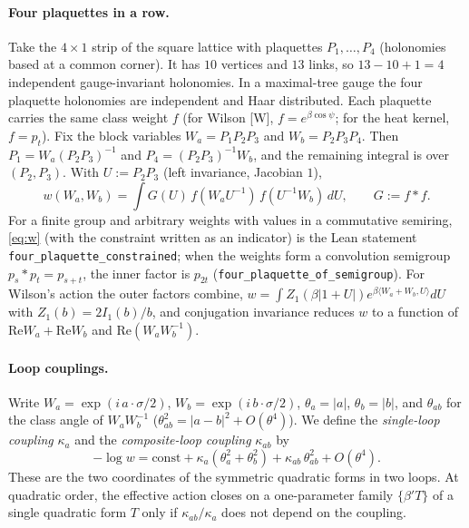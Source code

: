 \documentclass[11pt,a4paper]{article}
\theoremstyle{definition}
\theoremstyle{remark}
\newcommand{\code}[1]{\texttt{#1}}
\begin{document}
\paragraph{Four plaquettes in a row.}
Take the $4\times1$ strip of the square lattice with plaquettes $P_1,\dots,P_4$ (holonomies based at a common corner).
It has $10$ vertices and $13$ links, so $13-10+1=4$ independent gauge-invariant holonomies.
In a maximal-tree gauge the four plaquette holonomies are independent and Haar distributed.
Each plaquette carries the same class weight $f$ (for Wilson [W], $f=e^{\beta\cos\psi}$; for the heat kernel, $f=p_t$).
Fix the block variables $W_a=P_1P_2P_3$ and $W_b=P_2P_3P_4$.
Then $P_1=W_a(P_2P_3)^{-1}$ and $P_4=(P_2P_3)^{-1}W_b$, and the remaining integral is over $(P_2,P_3)$.
With $U:=P_2P_3$ (left invariance, Jacobian $1$),
\begin{equation}\label{eq:w}
w(W_a,W_b)=\int G(U)\,f(W_aU^{-1})\,f(U^{-1}W_b)\,dU,\qquad G:=f*f .
\end{equation}
For a finite group and arbitrary weights with values in a commutative semiring, \eqref{eq:w} (with the constraint written as an indicator) is the Lean statement \code{four\_plaquette\_constrained}; when the weights form a convolution semigroup $p_s*p_t=p_{s+t}$, the inner factor is $p_{2t}$ (\code{four\_plaquette\_of\_semigroup}).
For Wilson's action the outer factors combine, $w=\int Z_1(\beta|1+U|)e^{\beta\langle W_a+W_b,U\rangle}dU$ with $Z_1(b)=2I_1(b)/b$, and conjugation invariance reduces $w$ to a function of $\mathrm{Re}W_a+\mathrm{Re}W_b$ and $\mathrm{Re}(W_aW_b^{-1})$.

\paragraph{Loop couplings.}
Write $W_a=\exp(i\,a\cdot\sigma/2)$, $W_b=\exp(i\,b\cdot\sigma/2)$, $\theta_a=|a|$, $\theta_b=|b|$, and $\theta_{ab}$ for the class angle of $W_aW_b^{-1}$ ($\theta_{ab}^2=|a-b|^2+O(\theta^4)$).
We define the \emph{single-loop coupling} $\kappa_a$ and the \emph{composite-loop coupling} $\kappa_{ab}$ by
\begin{equation}\label{eq:kappa}
-\log w=\mathrm{const}+\kappa_a(\theta_a^2+\theta_b^2)+\kappa_{ab}\,\theta_{ab}^2+O(\theta^4).
\end{equation}
These are the two coordinates of the symmetric quadratic forms in two loops.
At quadratic order, the effective action closes on a one-parameter family $\{\beta'T\}$ of a single quadratic form $T$ only if $\kappa_{ab}/\kappa_a$ does not depend on the coupling.
\end{document}
